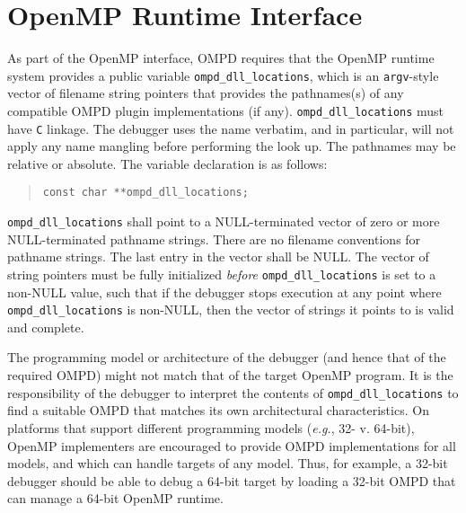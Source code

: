 \section{OpenMP Runtime Interface}
\label{runtime-interface:sec}

As part of the OpenMP interface, OMPD requires that the OpenMP
runtime system provides a public variable \verb|ompd_dll_locations|,
which is an \texttt{argv}-style vector of filename string pointers that
provides the pathnames(s) of any compatible OMPD plugin
implementations (if any).
\texttt{ompd\_dll\_locations} must have \texttt{C} linkage.
The debugger uses the name verbatim, and in particular, will
not apply any name mangling before performing the look up.
The pathnames may be relative or absolute. The variable declaration is as 
follows:

\begin{quote}
\begin{lstlisting}
const char **ompd_dll_locations;
\end{lstlisting}
\end{quote}

\noindent
\verb|ompd_dll_locations|  shall point to a NULL-terminated
vector of zero or more NULL-terminated pathname strings.
There are no filename conventions for pathname strings.
The last entry in the vector shall be NULL. 
The vector of string pointers must be fully initialized \emph{before}
\texttt{ompd\_dll\_locations} is set to a non-NULL value,
such that if the debugger stops execution at any point
where \texttt{ompd\_dll\_locations} is non-NULL, then the vector
of strings it points to is valid and complete.

The programming model or architecture of the debugger (and hence
that of the required OMPD) might not match that of the target
OpenMP program.
It is the responsibility of the debugger to interpret the contents
of \texttt{ompd\_dll\_locations} to find a suitable OMPD that matches
its own architectural characteristics.
On platforms that support different programming models
(\textit{e.g.}, 32- v. 64-bit), OpenMP implementers are encouraged
to provide OMPD implementations for all models, and which can handle
targets of any model.
Thus, for example, a 32-bit debugger should be able to debug a 64-bit target
by loading a 32-bit OMPD that can manage a 64-bit OpenMP runtime.

